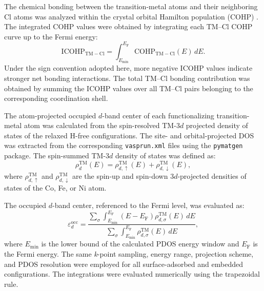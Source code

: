 \documentclass[journal=jacsat,manuscript=article]{achemso}
\begin{document}
The chemical bonding between the transition-metal atoms and their neighboring Cl atoms was analyzed within the crystal orbital Hamilton population (COHP)  \cite{Dronskowki2002}. The integrated COHP values were obtained by integrating each TM--Cl COHP curve up to the Fermi energy:
\begin{equation}
  \mathrm{ICOHP}_{\mathrm{TM-Cl}}
  =
  \int_{E_{\min}}^{E_{\mathrm{F}}}
  \mathrm{COHP}_{\mathrm{TM-Cl}}(E)\,dE.
  \label{eq:ICOHP}
\end{equation}
Under the sign convention adopted here, more negative ICOHP values indicate stronger net bonding interactions. The total TM--Cl bonding contribution was obtained by summing the ICOHP values over all TM--Cl pairs belonging to the corresponding coordination shell.

The atom-projected occupied $d$-band center of each functionalizing transition-metal atom was calculated from the spin-resolved TM-$3d$ projected density of states of the relaxed H-free configurations. The site- and orbital-projected DOS was extracted from the corresponding \texttt{vasprun.xml} files using the \texttt{pymatgen} package. The spin-summed TM-$3d$ density of states was defined as:
\begin{equation}
  \rho_{d}^{\mathrm{TM}}(E)
  =
  \rho_{d,\uparrow}^{\mathrm{TM}}(E)
  +
  \rho_{d,\downarrow}^{\mathrm{TM}}(E),
  \label{eq:spin_summed_dos}
\end{equation}
where $\rho_{d,\uparrow}^{\mathrm{TM}}$ and
$\rho_{d,\downarrow}^{\mathrm{TM}}$ are the spin-up and
spin-down $3d$-projected densities of states of the Co, Fe,
or Ni atom.

The occupied $d$-band center, referenced to the Fermi level,
was evaluated as:
\begin{equation}
  \varepsilon_{d}^{\mathrm{occ}}
  =
  \frac{
    \displaystyle
    \sum_{\sigma}
    \int_{E_{\min}}^{E_{\mathrm{F}}}
    (E-E_{\mathrm{F}})
    \rho_{d,\sigma}^{\mathrm{TM}}(E)\,dE
  }{
    \displaystyle
    \sum_{\sigma}
    \int_{E_{\min}}^{E_{\mathrm{F}}}
    \rho_{d,\sigma}^{\mathrm{TM}}(E)\,dE
  },
  \label{eq:d_band_center}
\end{equation}
where $E_{\min}$ is the lower bound of the calculated PDOS energy window and $E_{\mathrm{F}}$ is the Fermi energy. The same \textit{k}-point sampling, energy range, projection scheme, and PDOS resolution were employed for all surface-adsorbed and embedded configurations. The integrations were evaluated numerically using the trapezoidal rule.
\end{document}
